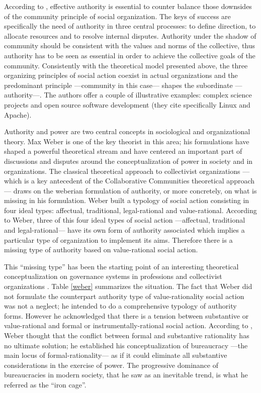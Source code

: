 According to \citet[59-61]{adler:2006}, effective authority is essential to counter balance those downsides of the community principle of social organization. The keys of success are specifically the need of authority in three central processes: to define direction, to allocate resources and to resolve internal disputes. Authority under the shadow of community should be consistent with the values and norms of the collective, thus authority has to be seen as essential in order to achieve the collective goals of the community. Consistently with the theoretical model presented above, the three organizing principles of social action coexist in actual organizations and the predominant principle ---community in this case--- shapes the subordinate ---authority---. The authors offer a couple of illustrative examples: complex science projects and open source software development (they cite specifically Linux and Apache).

Authority and power are two central concepts in sociological and organizational theory. Max Weber is one of the key theorist in this area; his formulations have shaped a powerful theoretical stream and have centered an important part of discussions and disputes around the conceptualization of power in society and in organizations. The classical theoretical approach to collectivist organizations ---which is a key antecedent of the Collaborative Communities theoretical approach--- draws on the weberian formulation of authority, or more concretely, on what is missing in his formulation. Weber built a typology of social action consisting in four ideal types: affectual, traditional, legal-rational and value-rational. According to Weber, three of this four ideal types of social action ---affectual, traditional and legal-rational--- have its own form of authority associated which implies a particular type of organization to implement its aims. Therefore there is a missing type of authority based on value-rational social action.

This ``missing type'' has been the starting point of an interesting theoretical conceptualization on governance systems in professions and collectivist organizations \citep{wilier:1967,satow:1975,rothschild:1979}. Table \ref{weber} summarizes the situation. The fact that Weber did not formulate the counterpart authority type of value-rationality social action was not a neglect; he intended to do a comprehensive typology of authority forms. However he acknowledged that there is a tension between substantive or value-rational and formal or instrumentally-rational social action. According to \citet[510]{rothschild:1979}, Weber thought that the conflict between formal and substantive rationality has no ultimate solution; he established his conceptualization of bureaucracy ---the main locus of formal-rationality--- as if it could eliminate all substantive considerations in the exercise of power. The progressive dominance of bureaucracies in modern society, that he saw as an inevitable trend, is what he referred as the ``iron cage''.

